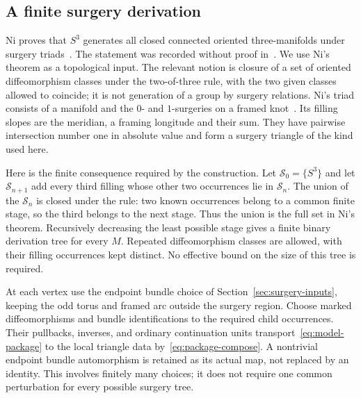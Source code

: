\documentclass[11pt]{amsart}
\theoremstyle{definition}
\theoremstyle{remark}
\theoremstyle{plain}
\begin{document}
\subsection{A finite surgery derivation}
Ni proves that $S^3$ generates all closed connected oriented
three-manifolds under surgery triads~\cite[Theorem~1.4]{Ni}.
The statement was recorded without proof in~\cite[Proposition~1]{Culler}.
We use Ni's theorem as a topological input. The relevant notion
is closure of a set of oriented diffeomorphism classes under the
two-of-three rule, with the two given classes allowed to coincide;
it is not generation of a group by surgery relations.
Ni's triad consists of a manifold and the $0$- and $1$-surgeries
on a framed knot~\cite[Definitions~1.1--1.3]{Ni}. Its filling
slopes are the meridian, a framing longitude and their sum.
They have pairwise intersection number one in absolute value
and form a surgery triangle of the kind used here.

Here is the finite consequence required by the construction.
Let $\mathcal S_0=\{S^3\}$ and let $\mathcal S_{n+1}$ add every
third filling whose other two occurrences lie in $\mathcal S_n$.
The union of the $\mathcal S_n$ is closed under the rule: two
known occurrences belong to a common finite stage, so the third
belongs to the next stage. Thus the union is the full set in
Ni's theorem. Recursively decreasing the least possible
stage gives a finite binary derivation tree for every $M$.
Repeated diffeomorphism classes are allowed, with their filling
occurrences kept distinct. No effective bound on the size of
this tree is required.

At each vertex use the endpoint bundle choice of
Section~\ref{sec:surgery-inputs}, keeping the odd torus and
framed arc outside the surgery region. Choose marked
diffeomorphisms and bundle identifications to the required child
occurrences. Their pullbacks, inverses, and ordinary continuation
units transport~\eqref{eq:model-package} to the local triangle
data by~\eqref{eq:package-compose}. A nontrivial endpoint bundle
automorphism is retained as its actual map, not replaced by an
identity. This involves finitely many choices; it does not
require one common perturbation for every possible surgery tree.
\end{document}
